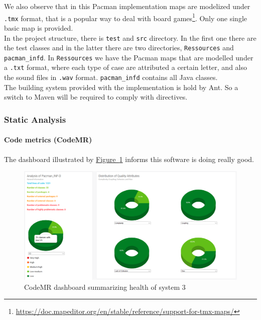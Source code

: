 \documentclass[]{article}
\newcommand{\wordlink}[2]{\hyperref[#2]{#1~\ref{#2}}}
\begin{document}
We also observe that in this Pacman implementation maps are modelized under \texttt{.tmx} format, that is a popular way to deal with board games\footnote{\url{https://doc.mapeditor.org/en/stable/reference/support-for-tmx-maps/}}. Only one single basic map is provided.\\


In the project structure, there is \texttt{test} and \texttt{src} directory. In the first one there are the test classes and in the latter there are two directories, \texttt{Ressources} and \texttt{pacman\_infd}. In \texttt{Ressources} we have the Pacman maps that are modelled under a \texttt{.txt} format, where each type of case are attributed a certain letter, and also the sound files in \texttt{.wav} format. \texttt{pacman\_infd} contains all Java classes.
\\

The building system provided with the implementation is hold by Ant. So a switch to Maven will be required to comply with directives.


\subsubsection{Static Analysis}

\paragraph{Code metrics (CodeMR)}

 The dashboard illustrated by \wordlink{Figure}{fig:S3_codeMR_dashboard} informs this software is doing really good.

\begin{figure}[h]
\includegraphics[width=\linewidth]{S3_codeMR_dashboard.png}
\caption{CodeMR dashboard summarizing health of system 3}
\label{fig:S3_codeMR_dashboard}
\end{figure}
\end{document}
